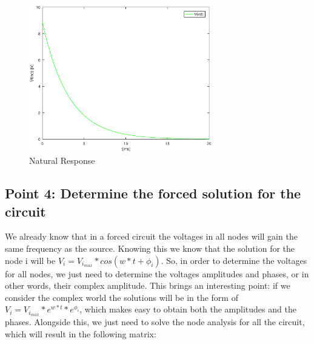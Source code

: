 \begin{figure}[H]
\centering
\includegraphics[width = 8cm]{NaturalResponse.eps}
\caption {Natural Response}
\end{figure}



\subsection{Point 4: Determine the forced solution for the circuit}

We already know that in a forced circuit the voltages in all nodes will gain the same frequency as the source. Knowing this we know that the solution for the node i will be $V_{i} = V_{i_{max}}*cos(w*t + \phi_{i})$. So, in order to determine the voltages for all nodes, we just need to determine the voltages amplitudes and phases, or in other words, their complex amplitude. This brings an interesting point: if we consider the complex world the solutions will be in the form of $V_{i} = V_{i_{max}}*e^{w*t} * e^{\phi_{i}}$, which makes easy to obtain both the amplitudes and the phases.
Alongside this, we just need to solve the node analysis for all the circuit, which will result in the following matrix:

\setlength{\parskip}{4em}

